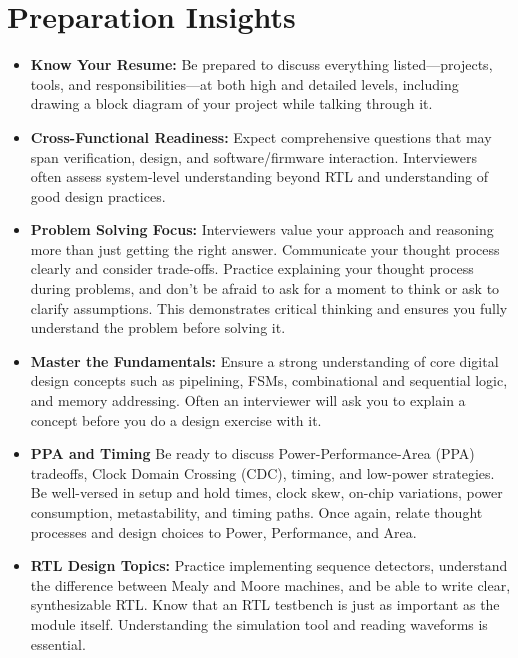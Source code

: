 \documentclass[11pt]{article}
\begin{document}
\section{Preparation Insights}
\begin{itemize}
    \item \textbf{Know Your Resume:} Be prepared to discuss everything
    listed—projects, tools, and responsibilities—at both high and detailed
    levels, including drawing a block diagram of your project while talking
    through it.

    \item \textbf{Cross-Functional Readiness:} Expect comprehensive questions
    that may span verification, design, and software/firmware interaction.
    Interviewers often assess system-level understanding beyond RTL and
    understanding of good design practices.

    \item \textbf{Problem Solving Focus:} Interviewers value your approach and
    reasoning more than just getting the right answer. Communicate your thought
    process clearly and consider trade-offs. Practice explaining your thought
    process during problems, and don't be afraid to ask for a moment to think
    or ask to clarify assumptions. This demonstrates critical thinking and
    ensures you fully understand the problem before solving it.

    \item \textbf{Master the Fundamentals:} Ensure a strong understanding of
    core digital design concepts such as pipelining, FSMs, combinational and
    sequential logic, and memory addressing. Often an interviewer will ask you
    to explain a concept before you do a design exercise with it.

    \item \textbf{PPA and Timing} Be ready to discuss Power-Performance-Area
    (PPA) tradeoffs, Clock Domain Crossing (CDC), timing, and low-power
    strategies. Be well-versed in setup and hold times, clock skew, on-chip
    variations, power consumption, metastability, and timing paths. Once again,
    relate thought processes and design choices to Power, Performance, and
    Area.

    \item \textbf{RTL Design Topics:} Practice implementing sequence detectors,
    understand the difference between Mealy and Moore machines, and be able to
    write clear, synthesizable RTL. Know that an RTL testbench is just as
    important as the module itself. Understanding the simulation tool and
    reading waveforms is essential.


\end{itemize}
\end{document}
